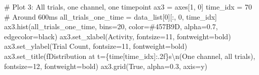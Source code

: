 \documentclass[
  11pt,
  letterpaper,
  oneside,
  openany]{book}
\newenvironment{Shaded}{\begin{snugshade}}{\end{snugshade}}
\newcommand{\CharTok}[1]{\textcolor[rgb]{0.13,0.47,0.30}{#1}}
\newcommand{\CommentTok}[1]{\textcolor[rgb]{0.37,0.37,0.37}{#1}}
\newcommand{\DecValTok}[1]{\textcolor[rgb]{0.68,0.00,0.00}{#1}}
\newcommand{\FloatTok}[1]{\textcolor[rgb]{0.68,0.00,0.00}{#1}}
\newcommand{\NormalTok}[1]{\textcolor[rgb]{0.00,0.23,0.31}{#1}}
\newcommand{\OperatorTok}[1]{\textcolor[rgb]{0.37,0.37,0.37}{#1}}
\newcommand{\SpecialCharTok}[1]{\textcolor[rgb]{0.37,0.37,0.37}{#1}}
\newcommand{\SpecialStringTok}[1]{\textcolor[rgb]{0.13,0.47,0.30}{#1}}
\newcommand{\StringTok}[1]{\textcolor[rgb]{0.13,0.47,0.30}{#1}}
\newcommand{\VariableTok}[1]{\textcolor[rgb]{0.07,0.07,0.07}{#1}}
\begin{document}
\begin{Shaded}
\begin{Highlighting}[]
\CommentTok{\# Plot 3: All trials, one channel, one timepoint}
\NormalTok{ax3 }\OperatorTok{=}\NormalTok{ axes[}\DecValTok{1}\NormalTok{, }\DecValTok{0}\NormalTok{]}
\NormalTok{time\_idx }\OperatorTok{=} \DecValTok{70}  \CommentTok{\# Around 600ms}
\NormalTok{all\_trials\_one\_time }\OperatorTok{=}\NormalTok{ data\_list[}\DecValTok{0}\NormalTok{][:, }\DecValTok{0}\NormalTok{, time\_idx]}
\NormalTok{ax3.hist(all\_trials\_one\_time, bins}\OperatorTok{=}\DecValTok{20}\NormalTok{, color}\OperatorTok{=}\StringTok{\textquotesingle{}\#457B9D\textquotesingle{}}\NormalTok{, alpha}\OperatorTok{=}\FloatTok{0.7}\NormalTok{, edgecolor}\OperatorTok{=}\StringTok{\textquotesingle{}black\textquotesingle{}}\NormalTok{)}
\NormalTok{ax3.set\_xlabel(}\StringTok{\textquotesingle{}Activity\textquotesingle{}}\NormalTok{, fontsize}\OperatorTok{=}\DecValTok{11}\NormalTok{, fontweight}\OperatorTok{=}\StringTok{\textquotesingle{}bold\textquotesingle{}}\NormalTok{)}
\NormalTok{ax3.set\_ylabel(}\StringTok{\textquotesingle{}Trial Count\textquotesingle{}}\NormalTok{, fontsize}\OperatorTok{=}\DecValTok{11}\NormalTok{, fontweight}\OperatorTok{=}\StringTok{\textquotesingle{}bold\textquotesingle{}}\NormalTok{)}
\NormalTok{ax3.set\_title(}\SpecialStringTok{f\textquotesingle{}Distribution at t=}\SpecialCharTok{\{}\NormalTok{time[time\_idx]}\SpecialCharTok{:.2f\}}\SpecialStringTok{s}\CharTok{\textbackslash{}n}\SpecialStringTok{(One channel, all trials)\textquotesingle{}}\NormalTok{, }
\NormalTok{              fontsize}\OperatorTok{=}\DecValTok{12}\NormalTok{, fontweight}\OperatorTok{=}\StringTok{\textquotesingle{}bold\textquotesingle{}}\NormalTok{)}
\NormalTok{ax3.grid(}\VariableTok{True}\NormalTok{, alpha}\OperatorTok{=}\FloatTok{0.3}\NormalTok{, axis}\OperatorTok{=}\StringTok{\textquotesingle{}y\textquotesingle{}}\NormalTok{)}


\end{Highlighting}
\end{Shaded}
\end{document}
